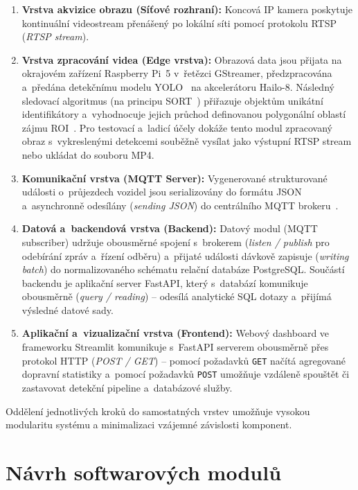 \begin{enumerate}
    \item \textbf{Vrstva akvizice obrazu (Síťové rozhraní):} Koncová \acs{IP} kamera poskytuje kontinuální videostream přenášený po lokální síti pomocí protokolu RTSP (\textit{RTSP stream}).
    \item \textbf{Vrstva zpracování videa (Edge vrstva):} Obrazová data jsou přijata na okrajovém zařízení Raspberry Pi~5 v~řetězci GStreamer, předzpracována a~předána detekčnímu modelu YOLO~\cite{redmon_yolo_2016} na akcelerátoru Hailo-8. Následný sledovací algoritmus (na principu \acs{SORT}~\cite{SORT_original_2016}) přiřazuje objektům unikátní identifikátory a~vyhodnocuje jejich průchod definovanou polygonální oblastí zájmu ROI~\cite{mdpi_roi_tracking_2022}. Pro testovací a~ladicí účely dokáže tento modul zpracovaný obraz s~vykreslenými detekcemi souběžně vysílat jako výstupní RTSP stream nebo ukládat do souboru MP4.
    \item \textbf{Komunikační vrstva (MQTT Server):} Vygenerované strukturované události o~průjezdech vozidel jsou serializovány do formátu \acs{JSON} a~asynchronně odesílány (\textit{sending JSON}) do centrálního MQTT brokeru~\cite{mqtt_oasis_2019}.
    \item \textbf{Datová a~backendová vrstva (Backend):} Datový modul (MQTT subscriber) udržuje obousměrné spojení s~brokerem (\textit{listen / publish} pro odebírání zpráv a~řízení odběru) a~přijaté události dávkově zapisuje (\textit{writing batch}) do normalizovaného schématu relační databáze PostgreSQL. Součástí backendu je aplikační server FastAPI, který s~databází komunikuje obousměrně (\textit{query / reading}) – odesílá analytické \acs{SQL} dotazy a~přijímá výsledné datové sady.
    \item \textbf{Aplikační a~vizualizační vrstva (Frontend):} Webový dashboard ve frameworku Streamlit komunikuje s~FastAPI serverem obousměrně přes protokol \acs{HTTP} (\textit{POST / GET}) – pomocí požadavků \texttt{GET} načítá agregované dopravní statistiky a~pomocí požadavků \texttt{POST} umožňuje vzdáleně spouštět či zastavovat detekční pipeline a~databázové služby.
\end{enumerate}

Oddělení jednotlivých kroků do samostatných vrstev umožňuje vysokou modularitu systému a minimalizaci vzájemné závislosti komponent.

\section{Návrh softwarových modulů}

